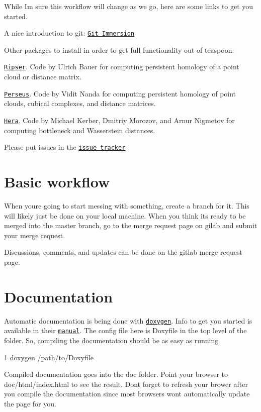 While I\textquotesingle{}m sure this workflow will change as we go, here are some links to get you started.


\begin{DoxyItemize}
\item A nice introduction to git\+: \href{http://gitimmersion.com/}{\tt Git Immersion}
\item Other packages to install in order to get full functionality out of teaspoon\+:
\begin{DoxyItemize}
\item \href{https://github.com/Ripser/ripser}{\tt Ripser}. Code by Ulrich Bauer for computing persistent homology of a point cloud or distance matrix.
\item \href{http://people.maths.ox.ac.uk/nanda/perseus/index.html}{\tt Perseus}. Code by Vidit Nanda for computing persistent homology of point clouds, cubical complexes, and distance matrices.
\item \href{https://bitbucket.org/grey_narn/hera}{\tt Hera}. Code by Michael Kerber, Dmitriy Morozov, and Arnur Nigmetov for computing bottleneck and Wasserstein distances.
\end{DoxyItemize}
\item Please put issues in the \href{https://gitlab.msu.edu/TSAwithTDA/teaspoon/issues}{\tt issue tracker}
\end{DoxyItemize}

\section*{Basic workflow}

When you\textquotesingle{}re going to start messing with something, create a branch for it. This will likely just be done on your local machine. When you think it\textquotesingle{}s ready to be merged into the master branch, go to the merge request page on gilab and submit your merge request.

Discussions, comments, and updates can be done on the gitlab merge request page.

\section*{Documentation}

Automatic documentation is being done with \href{www.doxygen.org}{\tt doxygen}. Info to get you started is available in their \href{http://www.stack.nl/~dimitri/doxygen/manual/index.html}{\tt manual}. The config file here is {\ttfamily Doxyfile} in the top level of the folder. So, compiling the documentation should be as easy as running 
\begin{DoxyCode}
1 doxygen /path/to/Doxyfile
\end{DoxyCode}
 Compiled documentation goes into the {\ttfamily doc} folder. Point your browser to {\ttfamily doc/html/index.\+html} to see the result. Don\textquotesingle{}t forget to refresh your brower after you compile the documentation since most browsers won\textquotesingle{}t automatically update the page for you.

